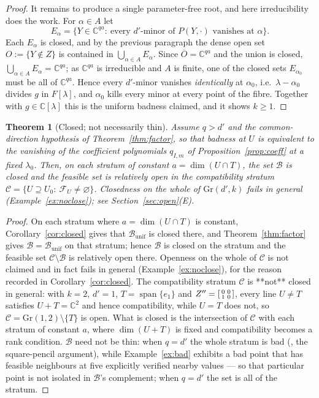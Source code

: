 \documentclass[journal]{IEEEtran}
\theoremstyle{plainn}
\newtheorem{thm}{Theorem}
\theoremstyle{remark}
\begin{document}
\begin{proof}
It remains to produce a single parameter-free root, and here irreducibility does the work. For
$\alpha\in A$ let
$$E_\alpha=\{Y\in\mathbb C^{qa}:\ \text{every }d'\text{-minor of }P(Y,\cdot)\text{ vanishes at }
\alpha\}.$$
Each $E_\alpha$ is closed, and by the previous paragraph the dense open set $O:=\{Y\notin Z\}$ is
contained in $\bigcup_{\alpha\in A}E_\alpha$. Since $\overline O=\mathbb C^{qa}$ and the union is closed,
$\bigcup_{\alpha\in A}E_\alpha=\mathbb C^{qa}$; as $\mathbb C^{qa}$ is irreducible and $A$ is finite, one of
the closed sets $E_{\alpha_0}$ must be all of $\mathbb C^{qa}$. Hence every
$d'$-minor vanishes \emph{identically} at $\alpha_0$, i.e.\ $\lambda-\alpha_0$ divides $g$ in
$F[\lambda]$, and $\alpha_0$ kills every minor at every point of the fibre. Together with $g\in\mathbb
C[\lambda]$ this is the uniform badness claimed, and it shows $k\ge1$.
\end{proof}

\begin{thm}[Closed; not necessarily thin]\label{thm:closed}
Assume $q>d'$ and the common-direction hypothesis of Theorem~\ref{thm:factor}, so that badness at
$U$ is equivalent to the vanishing of the coefficient polynomials $q_{I,m}$ of
Proposition~\ref{prop:coeff} at a fixed $\lambda_0$. Then, on each stratum of constant
$a=\dim(U\cap T)$, the set $\mathcal B$ is closed and the feasible set is relatively open in the
compatibility stratum $\mathcal C=\{U\supseteq U_0:\ \mathcal F_U\ne\varnothing\}$. Closedness on the
whole of $\mathrm{Gr}(d',k)$ fails in general (Example~\ref{ex:noclose}); see Section~\ref{sec:open}(E).
\end{thm}

\begin{proof}
On each stratum where $a=\dim(U\cap T)$ is constant, Corollary~\ref{cor:closed} gives that
$\mathcal B_{\mathrm{unif}}$ is closed there, and Theorem~\ref{thm:factor} gives
$\mathcal B=\mathcal B_{\mathrm{unif}}$ on that stratum; hence $\mathcal B$ is closed on the stratum and the
feasible set $\mathcal C\setminus\mathcal B$ is relatively open there. Openness on the whole of $\mathcal C$
is not claimed and in fact fails in general (Example~\ref{ex:noclose}), for the reason recorded in Corollary~\ref{cor:closed}. The compatibility stratum $\mathcal C$ is **not** closed in general: with $k=2$, $d'=1$,
$T=\operatorname{span}\{e_1\}$ and $Z''=\begin{bsmallmatrix}0&0\\1&0\end{bsmallmatrix}$, every line
$U\ne T$ satisfies $U+T=\mathbb C^{2}$ and hence compatibility, while $U=T$ does not, so
$\mathcal C=\mathrm{Gr}(1,2)\setminus\{T\}$ is open. What is closed is the intersection of $\mathcal C$
with each stratum of constant $a$, where $\dim(U+T)$ is fixed and compatibility becomes a rank
condition. $\mathcal B$ need not be thin: when $q=d'$ the whole stratum is
bad (\cite{paperI}, the square-pencil argument), while Example~\ref{ex:bad} exhibits a bad point that has feasible neighbours at five explicitly verified
nearby values --- so that particular point is not isolated in $\mathcal B$'s complement; when $q=d'$ the
set is all of the stratum.
\end{proof}
\end{document}
